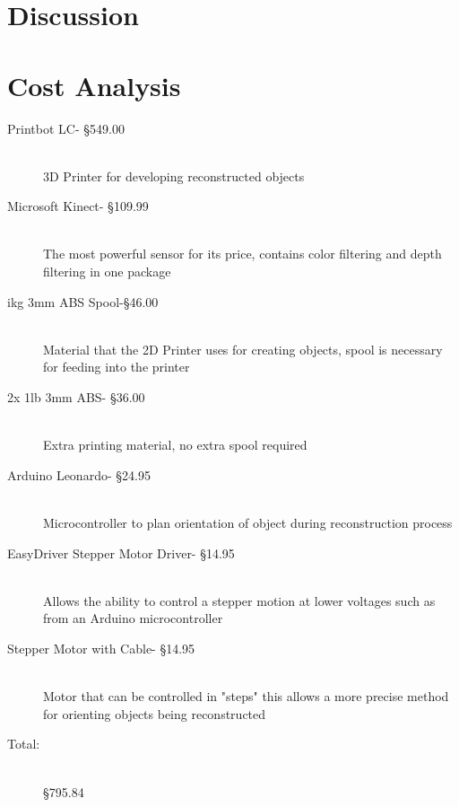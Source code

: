 \documentclass[12pt,twocolumn]{article}
\begin{document}
\section{Discussion}


\section{Cost Analysis}
  \begin{description}
  \item[Printbot LC- \S 549.00] \hfill \\
  3D Printer for developing reconstructed objects
  \item[Microsoft Kinect- \S 109.99] \hfill \\
  The most powerful sensor for its price, contains color filtering and depth filtering in one package
  \item[ikg 3mm ABS Spool-\S 46.00] \hfill \\
  Material that the 2D Printer uses for creating objects, spool is necessary for feeding into the printer
  \item[2x 1lb 3mm ABS- \S 36.00] \hfill \\
  Extra printing material, no extra spool required
  \item[Arduino Leonardo-  \S 24.95] \hfill \\
  Microcontroller to plan orientation of object during reconstruction process
  \item[EasyDriver Stepper Motor Driver- \S 14.95] \hfill \\
  Allows the ability to control a stepper motion at lower voltages such as from an Arduino microcontroller
  \item[Stepper Motor with Cable- \S 14.95] \hfill \\
  Motor that can be controlled in "steps" this allows a more precise method for orienting objects being reconstructed
  \item[Total:] \hfill \\
  \S 795.84
  \end{description}
\end{document}
